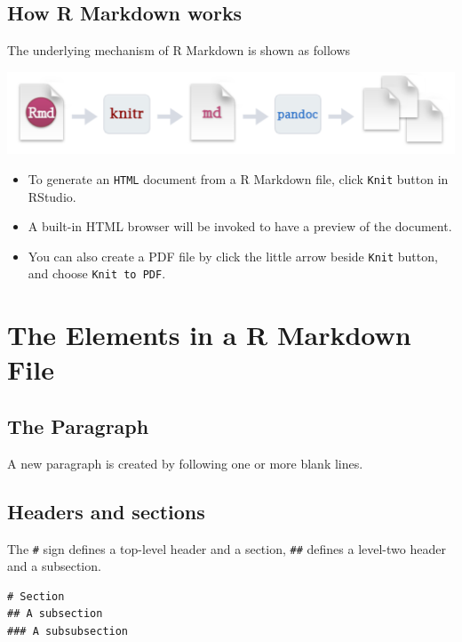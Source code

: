 \documentclass[11pt]{article}
\begin{document}
\subsection*{How R Markdown works}
\label{sec:org0d8ac88}

The underlying mechanism of R Markdown is shown as follows

\begin{center}
\includegraphics[width=.9\linewidth]{rmarkdown_workflow.png}
\end{center}

\begin{itemize}
\item To generate an \texttt{HTML} document from a R Markdown file, click \texttt{Knit}
button in RStudio.
\item A built-in HTML browser will be invoked to have a preview of the
document.
\item You can also create a PDF file by click the little arrow beside
\texttt{Knit} button, and choose \texttt{Knit to PDF}.
\end{itemize}

\section{The Elements in a R Markdown File}
\label{sec:org5ad3711}

\subsection*{The Paragraph}
\label{sec:org6337edc}

A new paragraph is created by following one or more blank lines.

\subsection*{Headers and sections}
\label{sec:org963cf63}

The \texttt{\#} sign defines a top-level header and a section, \texttt{\#\#} defines a
level-two header and a subsection.

\begin{verbatim}
# Section
## A subsection
### A subsubsection
\end{verbatim}
\end{document}
